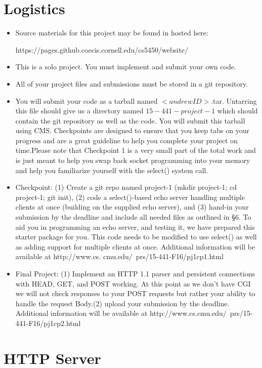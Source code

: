 \documentclass[12pt]{article}
\begin{document}
\section{Logistics}
\begin{itemize}
\item  Source materials for this project may be found in hosted here:

https://pages.github.coecis.cornell.edu/cs5450/website/

\item  This is a solo project. You must implement and submit your own code.
\item  All of your project files and submissions must be stored in a git repository.
\item You will submit your code as a tarball named $<andrewID>$.tar. Untarring this file should give us a directory named $15-441-project-1$ which should contain the git repository as well as the code. You will submit this tarball using CMS.
Checkpoints are designed to ensure that you keep tabs on your progress and are a great guideline to help you complete your project on time.Please note that Checkpoint 1 is a very small part of the total work and is just meant to help you swap back socket programming into your memory and help you familiarize yourself with the select() system call.
\item Checkpoint: (1) Create a git repo named project-1 (mkdir project-1; cd project-1; git init), (2) code a select()-based echo server handling multiple clients at once (building on the supplied echo server), and (3) hand-in your submission by the deadline and include all needed files as outlined in §6.
To aid you in programming an echo server, and testing it, we have prepared this starter package  for you. This code needs to be modified to use select() as well as adding support for multiple clients at once. Additional information will be available at http://www.cs. cmu.edu/~prs/15-441-F16/pj1cp1.html
\item Final Project: (1) Implement an HTTP 1.1 parser and persistent connections with HEAD, GET, and POST working. At this point as we don’t have CGI we will not check responses to your POST requests but rather your ability to handle the request Body.(2) upload your submission by the deadline. Additional information will be available at http://www.cs.cmu.edu/~prs/15-441-F16/pj1cp2.html
\end{itemize}

\section{HTTP Server}
\end{document}
